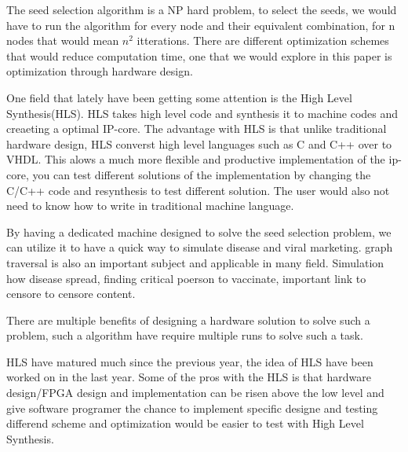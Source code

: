 The seed selection algorithm is a NP hard problem, to select the seeds, we would have to run the algorithm for every node and their equivalent combination, for n nodes that would mean $n^2$ itterations. There are different optimization schemes that would reduce computation time, one that we would explore in this paper is optimization through hardware design. 

One field that lately have been getting some attention is the High Level Synthesis(HLS).  HLS takes high level code and synthesis it to machine codes and creaeting a optimal IP-core. The advantage with HLS is that unlike traditional hardware design, HLS converst high level languages such as C and C++ over to VHDL. This alows a much more flexible and productive implementation of the ip-core, you can test different solutions of the implementation by changing the C/C++ code and resynthesis to test different solution. The user would also not need to know how to write in traditional machine language. 

By having a dedicated machine designed to solve the seed selection problem, we can utilize it to have a quick way to simulate disease and viral marketing. graph traversal is also an important subject and applicable in many field. Simulation how disease spread, finding critical poerson to vaccinate, important link to censore to censore content. 

There are multiple benefits of designing a hardware solution to solve such a problem, such a algorithm have require multiple runs to solve such a task.


HLS have matured much since the previous year, the idea of HLS have been worked on in the last year. Some of the pros with the HLS is that hardware design/FPGA design and implementation can be risen above the low level and give software programer the chance to implement specific designe and testing differend scheme and optimization would be easier to test with High Level Synthesis.